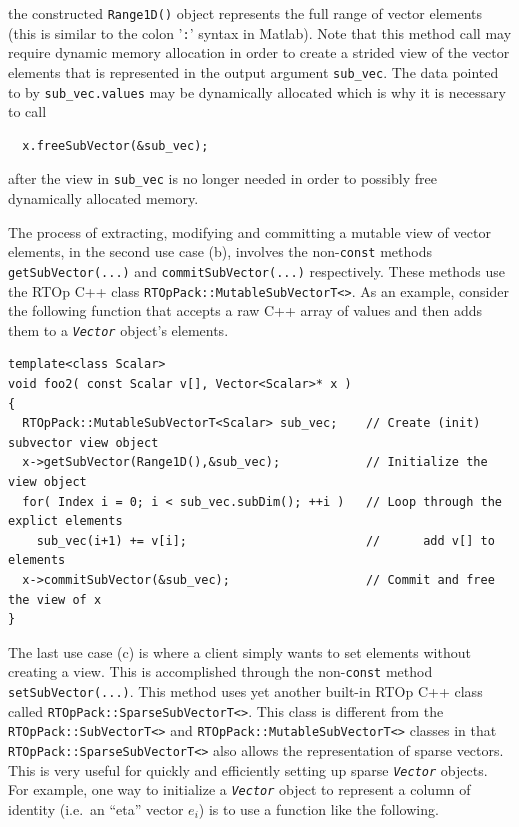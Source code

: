 {}\noindent{}the constructed {}\texttt{Range1D()} object represents
the full range of vector elements (this is similar to the colon
'\texttt{:}' syntax in Matlab).  Note that this method call may
require dynamic memory allocation in order to create a strided view of
the vector elements that is represented in the output argument
{}\texttt{sub\_vec}.  The data pointed to by
{}\texttt{sub\_vec.values} may be dynamically allocated which is why
it is necessary to call

{\scriptsize\begin{verbatim}
  x.freeSubVector(&sub_vec);
\end{verbatim}}

{}\noindent{}after the view in {}\texttt{sub\_vec} is no longer needed
in order to possibly free dynamically allocated memory.

The process of extracting, modifying and committing a mutable view of
vector elements, in the second use case (b), involves the
non-\texttt{const} methods {}\texttt{getSubVector(...)} and
{}\texttt{commit\-Sub\-Vector(...)} respectively.  These methods use
the RTOp C++ class {}\texttt{RTOpPack::\-Mutable\-Sub\-VectorT<>}.  As
an example, consider the following function that accepts a raw C++
array of values and then adds them to a {}\texttt{\textit{Vector}}
object's elements.

{\scriptsize\begin{verbatim}
template<class Scalar>
void foo2( const Scalar v[], Vector<Scalar>* x )
{
  RTOpPack::MutableSubVectorT<Scalar> sub_vec;    // Create (init) subvector view object
  x->getSubVector(Range1D(),&sub_vec);            // Initialize the view object
  for( Index i = 0; i < sub_vec.subDim(); ++i )   // Loop through the explict elements
    sub_vec(i+1) += v[i];                         //      add v[] to elements
  x->commitSubVector(&sub_vec);                   // Commit and free the view of x
}
\end{verbatim}}

The last use case (c) is where a client simply wants to set elements
without creating a view.  This is accomplished through the
non-\texttt{const} method {}\texttt{set\-Sub\-Vector(...)}.  This
method uses yet another built-in RTOp C++ class called
{}\texttt{RTOpPack::\-Sparse\-Sub\-VectorT<>}.  This class is
different from the {}\texttt{RTOpPack::\-SubVectorT<>} and
{}\texttt{RTOpPack::\-Mutable\-Sub\-VectorT<>} classes in that
{}\texttt{RTOpPack::\-Sparse\-Sub\-VectorT<>} also allows the
representation of sparse vectors.  This is very useful for quickly and
efficiently setting up sparse {}\texttt{\textit{Vector}} objects.  For
example, one way to initialize a {}\texttt{\textit{Vector}} object to
represent a column of identity (i.e.~an ``eta'' vector $e_i$) is to
use a function like the following.

